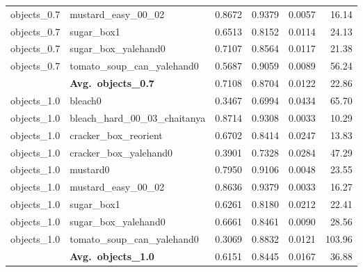 \begin{longtable}{llrrrr}
  objects_0.7 & mustard\_easy\_00\_02 & 0.8672 & 0.9379 & 0.0057 & 16.14 \\
  objects_0.7 & sugar\_box1 & 0.6513 & 0.8152 & 0.0114 & 24.13 \\
  objects_0.7 & sugar\_box\_yalehand0 & 0.7107 & 0.8564 & 0.0117 & 21.38 \\
  objects_0.7 & tomato\_soup\_can\_yalehand0 & 0.5687 & 0.9059 & 0.0089 & 56.24 \\
  \cmidrule{2-6}
  & \textbf{Avg.~objects_0.7} & 0.7108 & 0.8704 & 0.0122 & 22.86 \\
  \midrule
  objects_1.0 & bleach0 & 0.3467 & 0.6994 & 0.0434 & 65.70 \\
  objects_1.0 & bleach\_hard\_00\_03\_chaitanya & 0.8714 & 0.9308 & 0.0033 & 10.29 \\
  objects_1.0 & cracker\_box\_reorient & 0.6702 & 0.8414 & 0.0247 & 13.83 \\
  objects_1.0 & cracker\_box\_yalehand0 & 0.3901 & 0.7328 & 0.0284 & 47.29 \\
  objects_1.0 & mustard0 & 0.7950 & 0.9106 & 0.0048 & 23.55 \\
  objects_1.0 & mustard\_easy\_00\_02 & 0.8636 & 0.9379 & 0.0033 & 16.27 \\
  objects_1.0 & sugar\_box1 & 0.6261 & 0.8180 & 0.0212 & 22.41 \\
  objects_1.0 & sugar\_box\_yalehand0 & 0.6661 & 0.8461 & 0.0090 & 28.56 \\
  objects_1.0 & tomato\_soup\_can\_yalehand0 & 0.3069 & 0.8832 & 0.0121 & 103.96 \\
  \cmidrule{2-6}
  & \textbf{Avg.~objects_1.0} & 0.6151 & 0.8445 & 0.0167 & 36.88 \\
  \midrule
\bottomrule
\end{longtable}